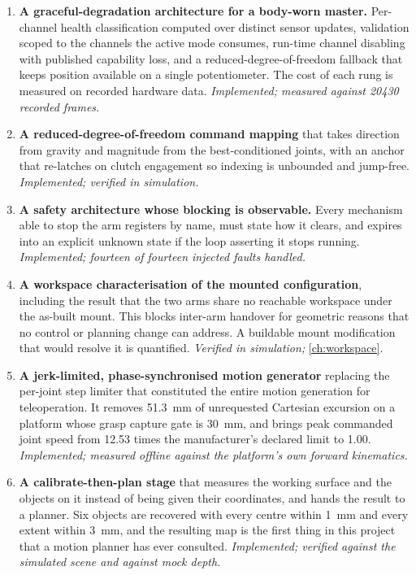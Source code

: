 \begin{enumerate}
  \item \textbf{A graceful-degradation architecture for a body-worn master.}
    Per-channel health classification computed over distinct sensor updates,
    validation scoped to the channels the active mode consumes, run-time
    channel disabling with published capability loss, and a reduced-degree-of-freedom
    fallback that keeps position available on a single potentiometer.
    The cost of each rung is measured on recorded hardware data.
    \emph{Implemented; measured against \num{20430} recorded frames.}

  \item \textbf{A reduced-degree-of-freedom command mapping} that takes
    direction from gravity and magnitude from the best-conditioned joints,
    with an anchor that re-latches on clutch engagement so indexing is
    unbounded and jump-free. \emph{Implemented; verified in simulation.}

  \item \textbf{A safety architecture whose blocking is observable.} Every
    mechanism able to stop the arm registers by name, must state how it
    clears, and expires into an explicit unknown state if the loop asserting
    it stops running. \emph{Implemented; fourteen of fourteen injected faults
    handled.}

  \item \textbf{A workspace characterisation of the mounted configuration},
    including the result that the two arms share no reachable workspace under
    the as-built mount. This blocks inter-arm handover for geometric reasons
    that no control or planning change can address. A buildable mount
    modification that would resolve it is quantified.
    \emph{Verified in simulation;} \cref{ch:workspace}.

  \item \textbf{A jerk-limited, phase-synchronised motion generator} replacing
    the per-joint step limiter that constituted the entire motion generation
    for teleoperation. It removes \SI{51.3}{\milli\metre} of unrequested
    Cartesian excursion on a platform whose grasp capture gate is
    \SI{30}{\milli\metre}, and brings peak commanded joint speed from
    \num{12.53} times the manufacturer's declared limit to \num{1.00}.
    \emph{Implemented; measured offline against the platform's own forward
    kinematics.}

  \item \textbf{A calibrate-then-plan stage} that measures the working surface
    and the objects on it instead of being given their coordinates, and hands
    the result to a planner. Six objects are recovered with every centre
    within \SI{1}{\milli\metre} and every extent within \SI{3}{\milli\metre},
    and the resulting map is the first thing in this project that a motion
    planner has ever consulted. \emph{Implemented; verified against the
    simulated scene and against mock depth.}


\end{enumerate}
